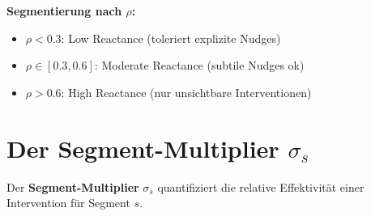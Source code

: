 \textbf{Segmentierung nach $\rho$:}
\begin{itemize}
\item $\rho < 0.3$: Low Reactance (toleriert explizite Nudges)
\item $\rho \in [0.3, 0.6]$: Moderate Reactance (subtile Nudges ok)
\item $\rho > 0.6$: High Reactance (nur unsichtbare Interventionen)
\end{itemize}


\section{Der Segment-Multiplier $\sigma_s$}
\label{sec:19-multiplier}

Der \textbf{Segment-Multiplier} $\sigma_s$ quantifiziert die relative Effektivität einer Intervention für Segment $s$.

